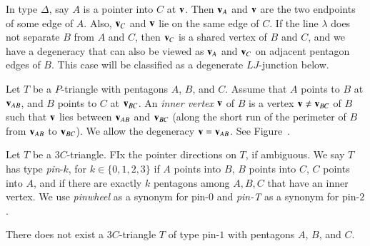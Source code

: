 In type $\Delta$, say $A$ is a pointer into $C$ at ${\mathbf v}$.  Then ${\mathbf v}_A$
and ${\mathbf v}$ are the two endpoints of some edge of $A$.  Also, ${\mathbf v}_C$ and
${\mathbf v}$ lie on the same edge of $C$.  If the line $\lambda$ does not
separate $B$ from $A$ and $C$, then ${\mathbf v}_C$ is a shared vertex of $B$
and $C$, and we have a degeneracy that can also be viewed as ${\mathbf v}_A$
and ${\mathbf v}_C$ on adjacent pentagon edges of $B$.  This case will be
classified as a degenerate $LJ$-junction below.

\begin{definition} Let $T$ be a $P$-triangle with pentagons $A$, $B$,
  and $C$.  Assume that $A$ points to $B$ at ${\mathbf v}_{AB}$, and $B$ points
  to $C$ at ${\mathbf v}_{BC}$.  An {\it inner vertex} ${\mathbf v}$ of $B$ is a vertex
  ${\mathbf v}\ne {\mathbf v}_{BC}$ of $B$ such that ${\mathbf v}$ lies between ${\mathbf v}_{AB}$ and
  ${\mathbf v}_{BC}$ (along the short run of the perimeter of $B$ from
  ${\mathbf v}_{AB}$ to ${\mathbf v}_{BC}$).  We allow the degeneracy ${\mathbf v}={\mathbf v}_{AB}$.
  See Figure~.
\end{definition}

\begin{definition} Let $T$ be a $3C$-triangle.  FIx the pointer
  directions on $T$, if ambiguous. We say $T$ has type {\it pin}-$k$,
  for $k\in \{0,1,2,3\}$ if $A$ points into $B$, $B$ points into $C$,
  $C$ points into $A$, and if there are exactly $k$ pentagons among
  $A,B,C$ that have an inner vertex.  We use {\it pinwheel} as a
  synonym for pin-$0$ and {\it pin-T} as a synonym for pin-$2$.
\end{definition}


\begin{lemma} There does not exist a $3C$-triangle $T$ of type pin-$1$
  with pentagons $A$, $B$, and $C$.
\end{lemma}

